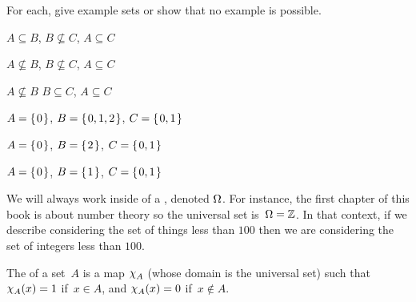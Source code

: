 \documentclass{ibl}  %
\begin{document}
\begin{ex} For each, give example sets or show that no example is possible.
\begin{items}
\item $A\subseteq B$, $B\not\subseteq C$, $A\subseteq C$
\item $A\not\subseteq B$, $B\not\subseteq C$, $A\subseteq C$
\item $A\not\subseteq B$ $B\subseteq C$, $A\subseteq C$    
\end{items}
\begin{ans}
\begin{items}
\item $A=\mbox{$\{\hspace{0.1em}0\hspace{0.1em}\}$}$, $B=\mbox{$\{\hspace{0.1em}0,1,2\hspace{0.1em}\}$}$, $C=\mbox{$\{\hspace{0.1em}0,1\hspace{0.1em}\}$}$
\item $A=\mbox{$\{\hspace{0.1em}0\hspace{0.1em}\}$}$, $B=\mbox{$\{\hspace{0.1em}2\hspace{0.1em}\}$}$, $C=\mbox{$\{\hspace{0.1em}0,1\hspace{0.1em}\}$}$
\item $A=\mbox{$\{\hspace{0.1em}0\hspace{0.1em}\}$}$, $B=\mbox{$\{\hspace{0.1em}1\hspace{0.1em}\}$}$, $C=\mbox{$\{\hspace{0.1em}0,1\hspace{0.1em}\}$}$
\end{items}
\end{ans}
\end{ex}

We will always work inside of a , 
denoted $\Omega$.
For instance, the first chapter of this book is about number theory  
so the universal set is~$\Omega=\mathbb{Z}$.
In that context, if we describe considering 
the set of things less than $100$ then 
we are considering the set of integers less than $100$.

\begin{df}
The  of a set~$A$ is a map
$\charfcn{A}$ (whose domain is the universal set) such that
$\charfcn{A}(x)=1$ if~$x\in A$, and $\charfcn{A}(x)=0$ if~$x\notin A$.  
\end{df}
\end{document}
